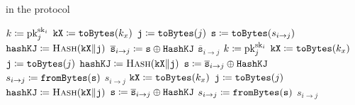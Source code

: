 \begin{algorithm}[t]
\caption{ in the  protocol}
\label{alg:dkg_encryption}
\begin{algorithmic}[1]
    \State $k \coloneqq{} \textrm{pk}{}_{j}^{\textrm{sk}{}_{i}}$
    \State $\texttt{kX} \coloneqq{} \texttt{toBytes}(k_{x})$
    \State $\texttt{j} \coloneqq{} \texttt{toBytes}(j)$
    \State $\texttt{s} \coloneqq{} \texttt{toBytes}(s_{i\to j})$
    \State $\texttt{hashKJ} \coloneqq{} \textsc{Hash}(\texttt{kX}\|\texttt{j})$
    \State $\overline{\texttt{s}}_{i\to j} \coloneqq{}
        \texttt{s} \oplus \texttt{HashKJ}$
    \State \Return $\overline{\texttt{s}}_{i\to j}$
\EndProcedure
\State
{}
    \State $k \coloneqq{} \textrm{pk}{}_{j}^{\textrm{sk}{}_{i}}$
    \State $\texttt{kX} \coloneqq{} \texttt{toBytes}(k_{x})$
    \State $\texttt{j} \coloneqq{} \texttt{toBytes}(j)$
    \State $\texttt{hashKJ} \coloneqq{} \textsc{Hash}(\texttt{kX}\|\texttt{j})$
    \State $\texttt{s} \coloneqq{}
        \overline{\texttt{s}}_{i\to j} \oplus \texttt{HashKJ}$
    \State $s_{i\to j} \coloneqq{} \texttt{fromBytes}(\texttt{s})$
    \State \Return $s_{i\to j}$
\EndProcedure
\State
{}
    \State $\texttt{kX} \coloneqq{} \texttt{toBytes}(k_{x})$
    \State $\texttt{j} \coloneqq{} \texttt{toBytes}(j)$
    \State $\texttt{hashKJ} \coloneqq{} \textsc{Hash}(\texttt{kX}\|\texttt{j})$
    \State $\texttt{s} \coloneqq{}
        \overline{\texttt{s}}_{i\to j} \oplus \texttt{HashKJ}$
    \State $s_{i\to j} \coloneqq{} \texttt{fromBytes}(\texttt{s})$
    \State \Return $s_{i\to j}$
\EndProcedure
\end{algorithmic}
\end{algorithm}
